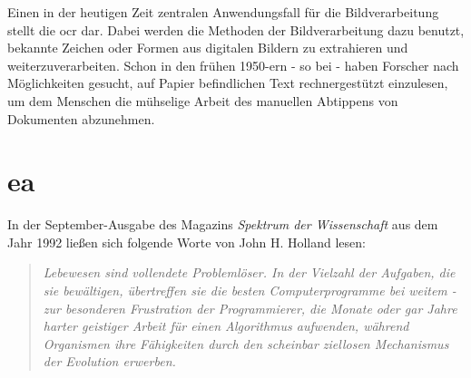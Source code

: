 		Einen in der heutigen Zeit zentralen Anwendungsfall für die Bildverarbeitung stellt die \gls{ocr} dar. Dabei werden die Methoden der Bildverarbeitung dazu benutzt, bekannte Zeichen oder Formen aus digitalen Bildern zu extrahieren und weiterzuverarbeiten. Schon in den frühen 1950-ern - so bei \cite{cher-et-al-ocr} - haben Forscher nach Möglichkeiten gesucht, auf Papier befindlichen Text rechnergestützt einzulesen, um dem Menschen die mühselige Arbeit des manuellen Abtippens von Dokumenten abzunehmen.
		
	
	\section{\gls{ea}}
	\label{sec:evol}
		
		In der September-Ausgabe des Magazins \textit{Spektrum der Wissenschaft} \cite{j-h-holland} aus dem Jahr 1992 ließen sich folgende Worte von John H. Holland lesen: \\
		
		\begin{quote}
			\textit{Lebewesen sind vollendete Problemlöser. In der Vielzahl der Aufgaben, die sie bewältigen, übertreffen sie die besten Computerprogramme bei weitem - zur besonderen Frustration der Programmierer, die Monate oder gar Jahre harter geistiger Arbeit für einen Algorithmus aufwenden, während Organismen ihre Fähigkeiten durch den scheinbar ziellosen Mechanismus der Evolution erwerben.}
		\end{quote}
		
